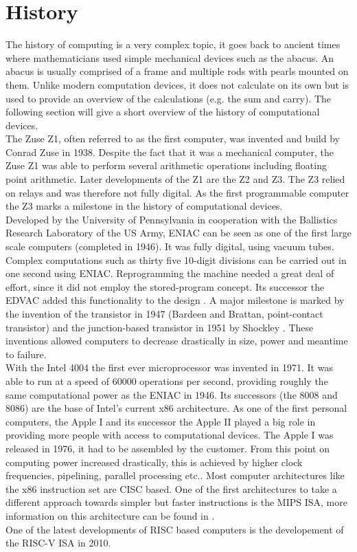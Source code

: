 \section{History}
The history of computing is a very complex topic, it goes back to ancient times where mathematicians used simple mechanical devices such as the abacus. An abacus is usually comprised of a frame and multiple rods with pearls mounted on them. Unlike modern computation devices, it does not calculate on its own but is used to provide an overview of the calculations (e.g. the sum and carry)\cite{ORegan:2021}. The following section will give a short overview of the history of computational devices.\\
The Zuse Z1, often referred to as the first computer, was invented and build by Conrad Zuse in 1938.
Despite the fact that it was a mechanical computer, the Zuse Z1 was able to perform several arithmetic operations including floating point arithmetic. Later developments of the Z1 are the Z2 and Z3. The Z3 relied on relays and was therefore not fully digital. As the first programmable computer the Z3 marks a milestone in the history of computational devices\cite{ORegan:2021}.\\
Developed by the University of Pennsylvania in cooperation with the Ballistics Research Laboratory of the US Army, \ac{ENIAC} can be seen as one of the first large scale computers (completed in 1946). It was fully digital, using vacuum tubes. Complex computations such as thirty five 10-digit divisions can be carried out in one second using \ac{ENIAC}. Reprogramming the machine needed a great deal of effort, since it did not employ the stored-program concept. Its successor the 
\ac{EDVAC} added this functionality to the design \cite{ORegan:2021}. 
A major milestone is marked by the invention of the transistor in 1947 (Bardeen and Brattan, point-contact transistor) and the junction-based transistor in 1951 by Shockley \cite{ORegan:2021}. These inventions allowed computers to decrease drastically in size, power and meantime to failure.\\
With the Intel 4004 the first ever microprocessor was invented in 1971. It was able to run at a speed of 60000 operations per second, providing roughly the same computational power as the \ac{ENIAC} in 1946\cite{ORegan:2021}. Its successors (the 8008 and 8086) are the base of Intel's current x86 architecture.
As one of the first personal computers, the Apple I and its successor the Apple II played a big role in providing more people with access to computational devices. The Apple I was released in 1976, it had to be assembled by the customer\cite{ORegan:2021}. 
From this point on computing power increased drastically, this is achieved by higher clock frequencies, pipelining, parallel processing etc.. Most computer architectures like the x86 instruction set are \ac{CISC} based. One of the first architectures to take a different approach towards simpler but faster instructions is the \ac{MIPS} \ac{ISA}, more information on this architecture can be found in \cite{patterson:2020}.\\
One of the latest developments of \ac{RISC} based computers is the developement of the RISC-V \ac{ISA} in 2010.
